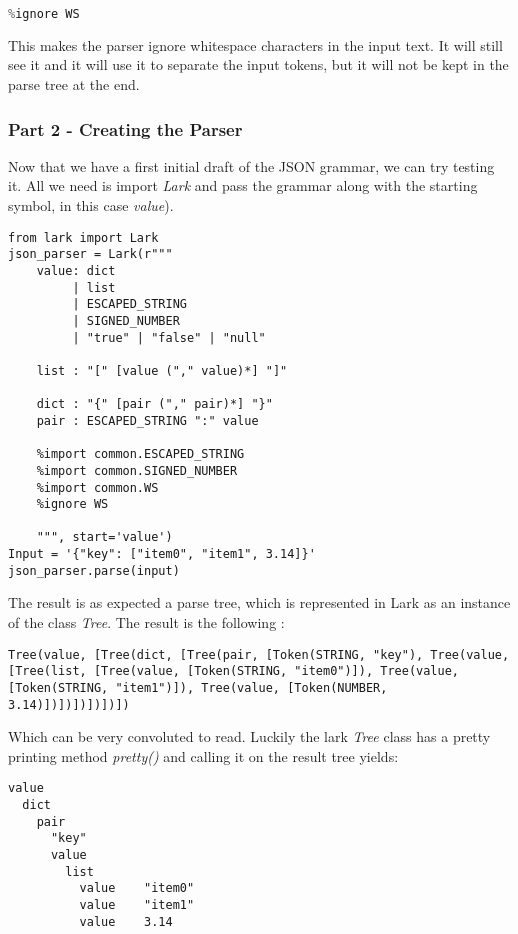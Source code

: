 \documentclass[12pt]{article}
\begin{document}
\begin{lstlisting}[language=Python]
%import common.WS
%ignore WS
\end{lstlisting}

This makes the parser ignore whitespace characters in the input text. It will still see it and it will use it to separate the input tokens, but it will not be kept in the parse tree at the end.

\subsubsection{Part 2 - Creating the Parser
}

Now that we have a first initial draft of the JSON grammar, we can try testing it. All we need is import \emph{Lark} and pass the grammar along with the starting symbol, in this case \emph{value}).

\begin{lstlisting}
from lark import Lark
json_parser = Lark(r"""
    value: dict
         | list
         | ESCAPED_STRING
         | SIGNED_NUMBER
         | "true" | "false" | "null"

    list : "[" [value ("," value)*] "]"

    dict : "{" [pair ("," pair)*] "}"
    pair : ESCAPED_STRING ":" value

    %import common.ESCAPED_STRING
    %import common.SIGNED_NUMBER
    %import common.WS
    %ignore WS

    """, start='value')
Input = '{"key": ["item0", "item1", 3.14]}'
json_parser.parse(input)
\end{lstlisting}

The result is as expected a parse tree, which is represented in Lark as an instance of the class \emph{Tree}. The result is the following :

\begin{lstlisting}
Tree(value, [Tree(dict, [Tree(pair, [Token(STRING, "key"), Tree(value, [Tree(list, [Tree(value, [Token(STRING, "item0")]), Tree(value, [Token(STRING, "item1")]), Tree(value, [Token(NUMBER, 3.14)])])])])])])
\end{lstlisting}

Which can be very convoluted to read. Luckily the lark \emph{Tree} class has a pretty printing method \emph{pretty()} and calling it on the result tree yields:

\begin{lstlisting}
value
  dict
    pair
      "key"
      value
        list
          value    "item0"
          value    "item1"
          value    3.14

\end{lstlisting}
\end{document}
